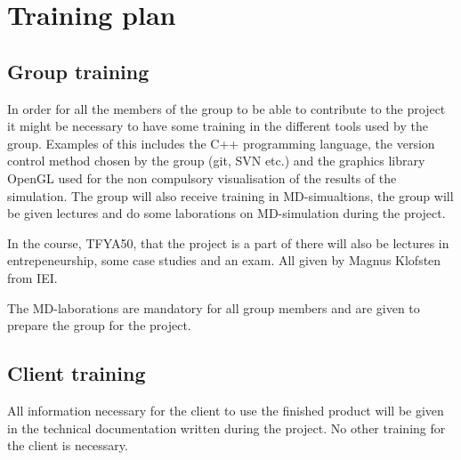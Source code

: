 \section{Training plan}

\subsection{Group training}
In order for all the members of the group to be able to contribute to the
project it might be necessary to have some training in the different tools
used by the group. Examples of this includes the C++ programming language, the
version control method chosen by the group (git, SVN etc.) and the graphics
library OpenGL used for the non compulsory visualisation of the results of the
simulation. The group will also receive training in MD-simualtions, the group
will be given lectures and do some laborations on MD-simulation during the
project.

In the course, TFYA50, that the project is a part of there will also be
lectures in entrepeneurship, some case studies and an exam. All given by
Magnus Klofsten from IEI.

The MD-laborations are mandatory for all group members and are given to
prepare the group for the project.

\subsection{Client training}
All information necessary for the client to use the finished product will be
given in the technical documentation written during the project. No other
training for the client is necessary.
